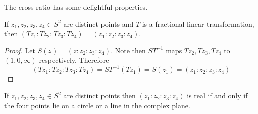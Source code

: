 The cross-ratio has some delightful properties.
\begin{theorem}\label{thm:cross-ratio-preserve}
If $z_1, z_2, z_3, z_4 \in S^2$ are distinct points and $T$ is a fractional linear transformation, then $(Tz_1: Tz_2 : Tz_3: Tz_4) = (z_1: z_2: z_3: z_4)$.
\end{theorem}
\begin{proof}
Let $S(z) =(z: z_2: z_3:z_4)$. Note then $ST^{-1}$ maps $Tz_2, Tz_3, Tz_4$ to $(1, 0, \infty)$ respectively. Therefore
$$ (Tz_1: Tz_2 : Tz_3: Tz_4) = ST^{-1}(Tz_1) = S(z_1) = (z_1: z_2: z_3: z_4) $$
\end{proof}
\begin{theorem}\label{thm:cross-ratio-real}
If $z_1, z_2, z_3, z_4 \in S^2$ are distinct points then $(z_1:z_2:z_3:z_4)$ is real if and only if the four points lie on a circle or a line in the complex plane.
\end{theorem}
